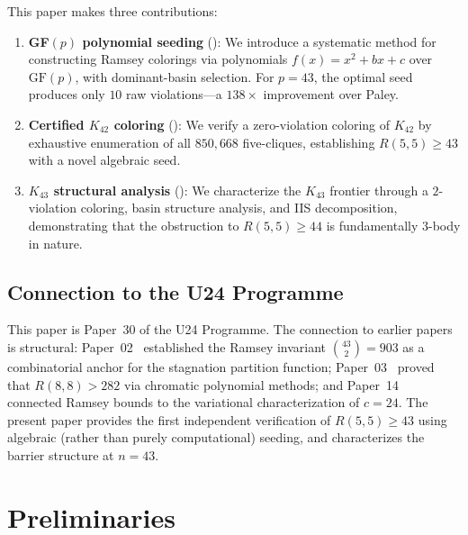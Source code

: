\documentclass[12pt,a4paper]{article}
\theoremstyle{definition}
\theoremstyle{remark}
\newcommand{\GF}[1]{\mathrm{GF}(#1)}
\newcommand{\Kn}[1]{K_{#1}}
\newcommand{\Rnum}[2]{R(#1,#2)}
\begin{document}
This paper makes three contributions:

\begin{enumerate}[label=(\roman*)]
    \item \textbf{GF$(p)$ polynomial seeding} (): We introduce a systematic method for constructing Ramsey colorings via polynomials $f(x) = x^2 + bx + c$ over $\GF{p}$, with dominant-basin selection.  For $p = 43$, the optimal seed produces only $10$ raw violations---a $138\times$ improvement over Paley.

    \item \textbf{Certified $\Kn{42}$ coloring} (): We verify a zero-violation coloring of $\Kn{42}$ by exhaustive enumeration of all $850{,}668$ five-cliques, establishing $\Rnum{5}{5} \ge 43$ with a novel algebraic seed.

    \item \textbf{$\Kn{43}$ structural analysis} (): We characterize the $\Kn{43}$ frontier through a $2$-violation coloring, basin structure analysis, and IIS decomposition, demonstrating that the obstruction to $\Rnum{5}{5} \ge 44$ is fundamentally $3$-body in nature.
\end{enumerate}

\subsection{Connection to the U24 Programme}

This paper is Paper~30 of the U24 Programme.  The connection to earlier papers is structural: Paper~02~\cite{dwr02} established the Ramsey invariant $\binom{43}{2} = 903$ as a combinatorial anchor for the stagnation partition function; Paper~03~\cite{dwr03} proved that $R(8,8) > 282$ via chromatic polynomial methods; and Paper~14~\cite{dwr14} connected Ramsey bounds to the variational characterization of $c = 24$.  The present paper provides the first independent verification of $\Rnum{5}{5} \ge 43$ using algebraic (rather than purely computational) seeding, and characterizes the barrier structure at $n = 43$.


\section{Preliminaries}\label{sec:prelim}
\end{document}
